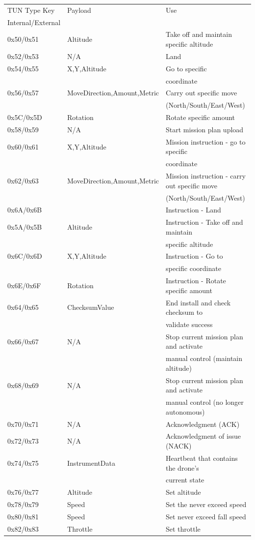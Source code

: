 \documentclass[12pt,a4paper]{article}
\begin{document}
	\begin{tabular}{l | l | l}
	TUN Type Key & Payload & Use \\
	Internal/External &  & \\
	\hline
	0x50/0x51 & Altitude & Take off and maintain specific altitude \\
	0x52/0x53 & N/A & Land \\ 
	0x54/0x55 & X,Y,Altitude & Go to specific\\
	& & coordinate \\
	0x56/0x57 & MoveDirection,Amount,Metric & Carry out specific move\\  		& & (North/South/East/West) \\
	0x5C/0x5D & Rotation & Rotate specific amount \\
	0x58/0x59 & N/A & Start mission plan upload \\
	0x60/0x61 & X,Y,Altitude & Mission instruction - go to specific\\ & & coordinate \\
	0x62/0x63 & MoveDirection,Amount,Metric & Mission instruction - carry out specific move\\
	& & (North/South/East/West) \\
	0x6A/0x6B &  & Instruction - Land \\  
	0x5A/0x5B & Altitude & Instruction - Take off and maintain \\ 		    & & specific altitude \\
	0x6C/0x6D & X,Y,Altitude & Instruction - Go to  \\
		& & specific coordinate \\
	0x6E/0x6F & Rotation & Instruction - Rotate specific amount \\
	0x64/0x65 & ChecksumValue & End install and check checksum to\\ 	& & validate success \\
	0x66/0x67 & N/A & Stop current mission plan and activate\\
	& & manual control (maintain altitude) \\
	0x68/0x69 & N/A & Stop current mission plan and activate\\
	& & manual control (no longer autonomous) \\
	0x70/0x71 & N/A & Acknowledgment (ACK)\\
	0x72/0x73 & N/A & Acknowledgment of issue (NACK) \\
	0x74/0x75 & InstrumentData & Heartbeat that contains the drone's\\ & & current state \\ 
	0x76/0x77 & Altitude & Set altitude \\
	0x78/0x79 & Speed & Set the never exceed speed \\ 
	0x80/0x81 & Speed & Set never exceed fall speed \\
	0x82/0x83 & Throttle & Set throttle
	
	\end{tabular}
	
\end{document}
